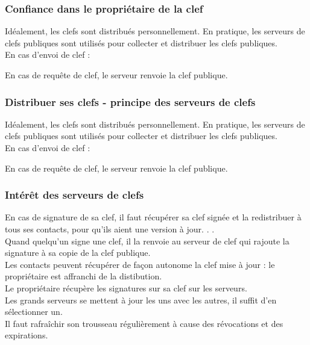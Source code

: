 \documentclass{beamer}
\begin{document}
\begin{frame}
\frametitle{Confiance dans le propriétaire de la clef} 
Idéalement, les clefs sont distribués personnellement. En pratique, les serveurs de clefs publiques sont utilisés pour collecter et distribuer les clefs publiques.
\\
En cas d’envoi de clef :
\begin{itemize}
\end{itemize}
En cas de requête de clef, le serveur renvoie la clef publique.
\end{frame}

\begin{frame}
\frametitle{Distribuer ses clefs - principe des serveurs de clefs} 

Idéalement, les clefs sont distribués personnellement. En pratique, les serveurs de clefs publiques sont utilisés pour collecter et distribuer les clefs publiques.
\\
En cas d’envoi de clef :
\begin{itemize}
\end{itemize}
En cas de requête de clef, le serveur renvoie la clef publique.
\end{frame}


\begin{frame}
\frametitle{Intérêt des serveurs de clefs} 

En cas de signature de sa clef, il faut récupérer sa clef signée et la redistribuer à tous ses contacts, pour qu’ils aient une version à jour. . .
\\
Quand quelqu’un signe une clef, il la renvoie au serveur de clef
qui rajoute la signature à sa copie de la clef publique.
\\
 Les contacts peuvent récupérer de façon autonome la clef mise à jour : le propriétaire est affranchi de la distibution.
\\
Le propriétaire récupère les signatures sur sa clef sur les serveurs.
\\
Les grands serveurs se mettent à jour les uns avec les autres, il suffit d’en sélectionner un.
\\
Il faut rafraîchir son trousseau régulièrement à cause des révocations et des expirations.
\end{frame}
\end{document}
